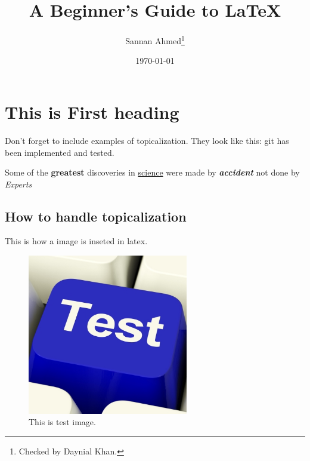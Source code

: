 \documentclass[12pt, A4]{article} %
\title{A Beginner's Guide to \LaTeX}
\author{Sannan Ahmed\thanks{Checked by Daynial Khan.}}
\date{\today} %
\begin{document}

\begin{titlepage}
\maketitle
\thispagestyle{empty} %
\end{titlepage}


\tableofcontents
\newpage

\section{This is First heading}

Don't forget to include examples of topicalization.
They look like this:
git has been implemented and tested.

Some of the \textbf{greatest}  
discoveries in \underline{science} 
were made by \textbf{\textit{accident}}
not done by \emph{Experts}
\subsection{How to handle topicalization}
This is how a image is inseted in latex.

\begin{figure}[!htb] %
	\centering
	\includegraphics[width=7cm]{avatar} 
	\caption{This is test image.}
\end{figure}
\end{document}
